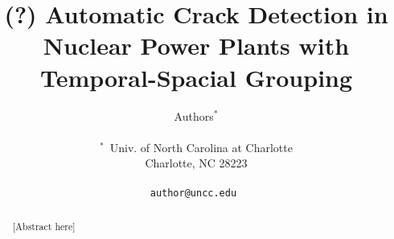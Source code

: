 \documentclass[10pt,twocolumn,letterpaper]{article}
\begin{document}
\title{(?) Automatic Crack Detection in Nuclear Power Plants with Temporal-Spacial Grouping}

\author{
Authors$^\ast$ \\
\begin{tabular}{c c}
$^\ast$~Univ. of North Carolina at Charlotte \\
Charlotte, NC 28223\\
\end{tabular}\\
{\tt \small author@uncc.edu  } }
\maketitle

\begin{abstract}
[Abstract here]
\end{abstract}








\end{document}
